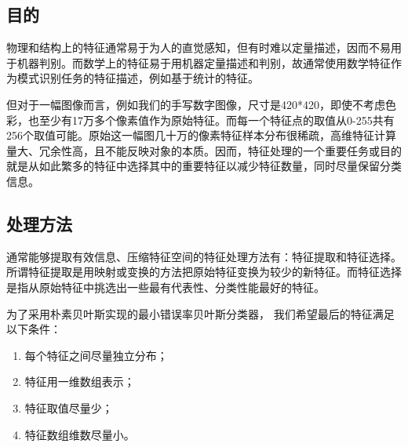 \documentclass[UTF8, a4paper, 12pt]{report}
\begin{document}
		\subsection{目的}
			物理和结构上的特征通常易于为人的直觉感知，但有时难以定量描述，因而不易用于机器判别。而数学上的特征易于用机器定量描述和判别，故通常使用数学特征作为模式识别任务的特征描述，例如基于统计的特征。

			但对于一幅图像而言，例如我们的手写数字图像，尺寸是420*420，即使不考虑色彩，也至少有17万多个像素值作为原始特征。而每一个特征点的取值从0-255共有256个取值可能。原始这一幅图几十万的像素特征样本分布很稀疏，高维特征计算量大、冗余性高，且不能反映对象的本质。因而，特征处理的一个重要任务或目的就是从如此繁多的特征中选择其中的重要特征以减少特征数量，同时尽量保留分类信息。

		\subsection{处理方法}
			通常能够提取有效信息、压缩特征空间的特征处理方法有：特征提取和特征选择。所谓特征提取是用映射或变换的方法把原始特征变换为较少的新特征。而特征选择是指从原始特征中挑选出一些最有代表性、分类性能最好的特征。
		
			为了采用朴素贝叶斯实现的最小错误率贝叶斯分类器， 我们希望最后的特征满足以下条件：
			\begin{enumerate}[itemindent=1em]
				\renewcommand{\labelenumi}{\theenumi)}
				\item 每个特征之间尽量独立分布；
				\item 特征用一维数组表示；
				\item 特征取值尽量少；
				\item 特征数组维数尽量小。
			\end{enumerate}
\end{document}
